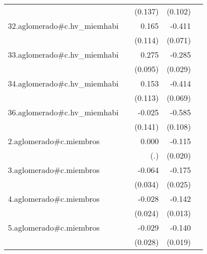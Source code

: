 {\begin{longtable}{l*{4}{D{.}{.}{-1}}}
            &                     &     (0.137)         &     (0.102)         &                     \\
\addlinespace
32.aglomerado#c.hv\_miemhabi&                     &       0.165         &      -0.411\sym{***}&                     \\
            &                     &     (0.114)         &     (0.071)         &                     \\
\addlinespace
33.aglomerado#c.hv\_miemhabi&                     &       0.275\sym{**} &      -0.285\sym{***}&                     \\
            &                     &     (0.095)         &     (0.029)         &                     \\
\addlinespace
34.aglomerado#c.hv\_miemhabi&                     &       0.153         &      -0.414\sym{***}&                     \\
            &                     &     (0.113)         &     (0.069)         &                     \\
\addlinespace
36.aglomerado#c.hv\_miemhabi&                     &      -0.025         &      -0.585\sym{***}&                     \\
            &                     &     (0.141)         &     (0.108)         &                     \\
\addlinespace
2.aglomerado#c.miembros&                     &       0.000         &      -0.115\sym{***}&                     \\
            &                     &         (.)         &     (0.020)         &                     \\
\addlinespace
3.aglomerado#c.miembros&                     &      -0.064         &      -0.175\sym{***}&                     \\
            &                     &     (0.034)         &     (0.025)         &                     \\
\addlinespace
4.aglomerado#c.miembros&                     &      -0.028         &      -0.142\sym{***}&                     \\
            &                     &     (0.024)         &     (0.013)         &                     \\
\addlinespace
5.aglomerado#c.miembros&                     &      -0.029         &      -0.140\sym{***}&                     \\
            &                     &     (0.028)         &     (0.019)         &                     \\

\end{longtable}}
